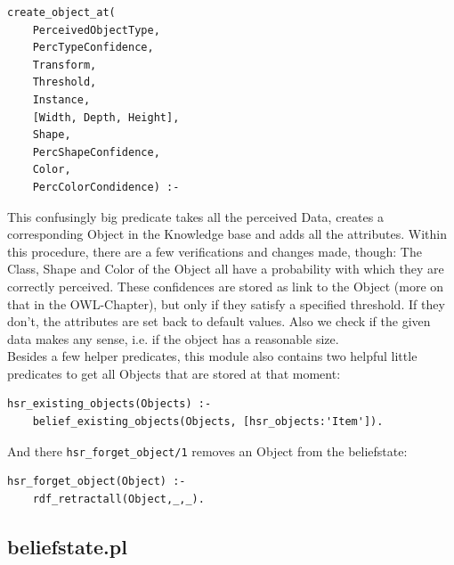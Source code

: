 \documentclass[main.tex]{subfiles}
\begin{document}
\begin{lstlisting}
create_object_at(
	PerceivedObjectType, 
	PercTypeConfidence, 
	Transform, 
	Threshold, 
	Instance, 
	[Width, Depth, Height], 
	Shape, 
	PercShapeConfidence, 
	Color, 
	PercColorCondidence) :-
\end{lstlisting}
This confusingly big predicate takes all the perceived Data, creates a corresponding Object in the Knowledge base and adds all the attributes. Within this procedure, there are a few verifications and changes made, though: The Class, Shape and Color of the Object all have a probability with which they are correctly perceived. These confidences are stored as link to the Object (more on that in the OWL-Chapter), but only if they satisfy a specified threshold. If they don't, the attributes are set back to default values. Also we check if the given data makes any sense, i.e. if the object has a reasonable size.\\
Besides a few helper predicates, this module also contains two helpful little predicates to get all Objects that are stored at that moment:
\begin{lstlisting}
hsr_existing_objects(Objects) :-
    belief_existing_objects(Objects, [hsr_objects:'Item']).
\end{lstlisting}
And there \texttt{hsr\_forget\_object/1} removes an Object from the beliefstate:
\begin{lstlisting}
hsr_forget_object(Object) :-
    rdf_retractall(Object,_,_).
\end{lstlisting}

\subsection{beliefstate.pl}
\end{document}
